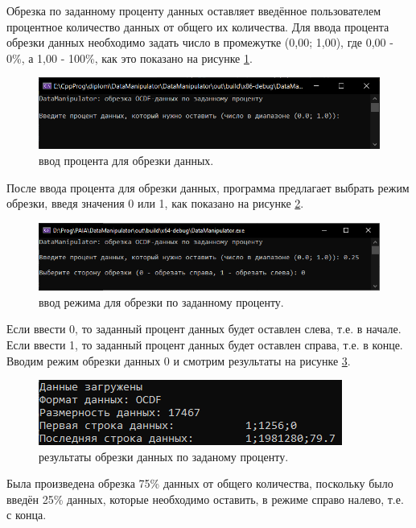 {\standartFont

  \par Обрезка по заданному проценту данных оставляет введённое пользователем процентное количество данных от общего их количества. Для ввода процента обрезки данных необходимо задать число в промежутке (0,00; 1,00), где 0,00 - 0\%, а 1,00 - 100\%, как это показано на рисунке \ref{fig:OCDFcutper1}. 

  \begin{figure}[H]
    \centering
    \includegraphics{images/forDataManipulator/OCDFcutpercentstage1.png}
    \caption{ввод процента для обрезки данных.} 
    \label{fig:OCDFcutper1}
  \end{figure}

  \par После ввода процента для обрезки данных, программа предлагает выбрать режим обрезки, введя значения 0 или 1, как показано на рисунке \ref{fig:OCDFcutper2}. 

  \begin{figure}[H]
    \centering
    \includegraphics[width=\textwidth]{images/forDataManipulator/OCDFcutpercentstage2.png}
    \caption{ввод режима для обрезки по заданному проценту.} 
    \label{fig:OCDFcutper2}
  \end{figure}

  \par Если ввести 0, то заданный процент данных будет оставлен слева, т.е. в начале. Если ввести 1, то заданный процент данных будет оставлен справа, т.е. в конце. Вводим режим обрезки данных 0 и смотрим результаты на рисунке \ref{fig:ExOCDFdataAftCatPer}. 

  \begin{figure}[H]
    \centering
    \includegraphics{images/forDataManipulator/ExOCDFdataAftCatPer.png}
    \caption{результаты обрезки данных по заданому проценту.} 
    \label{fig:ExOCDFdataAftCatPer}
  \end{figure}

  \par Была произведена обрезка 75\% данных от общего количества, поскольку было введён 25\% данных, которые необходимо оставить, в режиме справо налево, т.е. с конца. 

  \par 
}

